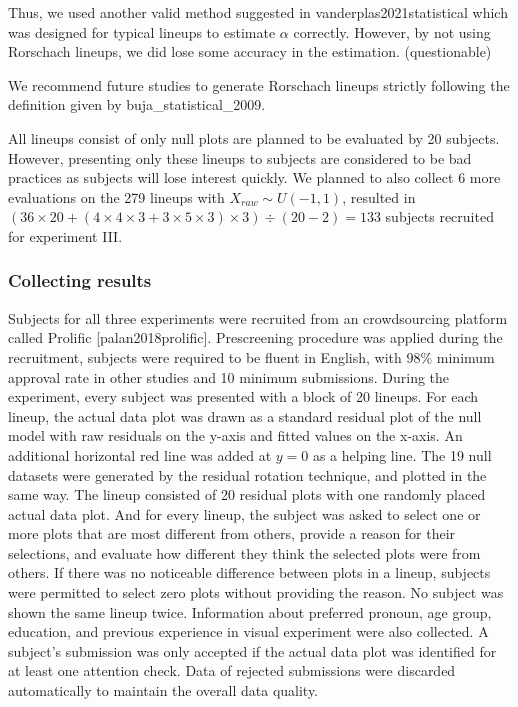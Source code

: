 \documentclass[]{interact}
\theoremstyle{plain}%
\theoremstyle{definition}
\theoremstyle{remark}
\begin{document}
Thus, we used another valid method suggested in
vanderplas2021statistical which was designed for typical lineups to
estimate \(\alpha\) correctly. However, by not using Rorschach lineups,
we did lose some accuracy in the estimation. (questionable)

We recommend future studies to generate Rorschach lineups strictly
following the definition given by buja\_statistical\_2009.

All lineups consist of only null plots are planned to be evaluated by 20
subjects. However, presenting only these lineups to subjects are
considered to be bad practices as subjects will lose interest quickly.
We planned to also collect 6 more evaluations on the 279 lineups with
\(X_{raw} \sim U(-1,1)\), resulted in
\((36 \times 20 + (4 \times 4 \times 3 + 3 \times 5 \times 3) \times 3) \div (20-2) = 133\)
subjects recruited for experiment III.

\hypertarget{collecting-results}{%
\subsubsection{Collecting results}\label{collecting-results}}

Subjects for all three experiments were recruited from an crowdsourcing
platform called Prolific {[}palan2018prolific{]}. Prescreening procedure
was applied during the recruitment, subjects were required to be fluent
in English, with \(98\%\) minimum approval rate in other studies and 10
minimum submissions. During the experiment, every subject was presented
with a block of 20 lineups. For each lineup, the actual data plot was
drawn as a standard residual plot of the null model with raw residuals
on the y-axis and fitted values on the x-axis. An additional horizontal
red line was added at \(y = 0\) as a helping line. The 19 null datasets
were generated by the residual rotation technique, and plotted in the
same way. The lineup consisted of 20 residual plots with one randomly
placed actual data plot. And for every lineup, the subject was asked to
select one or more plots that are most different from others, provide a
reason for their selections, and evaluate how different they think the
selected plots were from others. If there was no noticeable difference
between plots in a lineup, subjects were permitted to select zero plots
without providing the reason. No subject was shown the same lineup
twice. Information about preferred pronoun, age group, education, and
previous experience in visual experiment were also collected. A
subject's submission was only accepted if the actual data plot was
identified for at least one attention check. Data of rejected
submissions were discarded automatically to maintain the overall data
quality.
\end{document}
